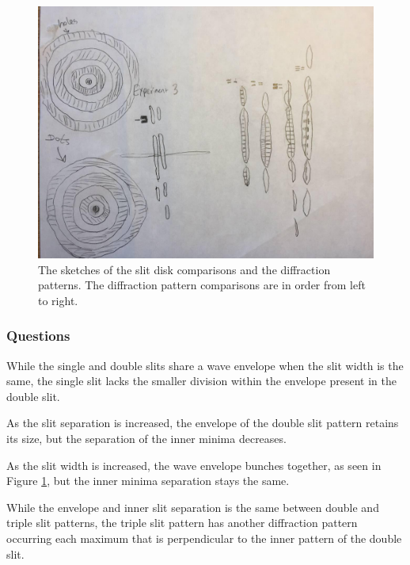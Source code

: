 \documentclass[12pt]{article}
\begin{document}
\begin{figure}[H]
  \label{pic:exp3}
  \begin{center}
    \includegraphics[scale=0.3]{exp3.jpg}
  \end{center}
  \caption{The sketches of the slit disk comparisons and the diffraction
    patterns. The diffraction pattern comparisons are in order from left to
    right.}
\end{figure}

\subsubsection{Questions}

\subsubsubsection{}

\qq While the single and double slits share a wave envelope when the slit width
is the same, the single slit lacks the smaller division within the envelope
present in the double slit.

\subsubsubsection{}

\qq As the slit separation is increased, the envelope of the double slit pattern
retains its size, but the separation of the inner minima decreases.

\subsubsubsection{}

\qq As the slit width is increased, the wave envelope bunches together, as seen
in Figure \ref{pic:exp3}, but the inner minima separation stays the same.

\subsubsubsection{}

\qq While the envelope and inner slit separation is the same between double and
triple slit patterns, the triple slit pattern has another diffraction pattern
occurring each maximum that is perpendicular to the inner pattern of the double
slit.
\end{document}
